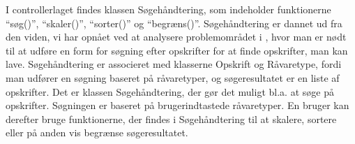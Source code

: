 I controllerlaget findes klassen Søgehåndtering, som indeholder funktionerne ``søg()'', ``skaler()'', ``sorter()'' og ``begræns()''. Søgehåndtering er dannet ud fra den viden, vi har opnået ved at analysere problemområdet i , hvor man er nødt til at udføre en form for søgning efter opskrifter for at finde opskrifter, man kan lave. Søgehåndtering er associeret med klasserne Opskrift og Råvaretype, fordi man udfører en søgning baseret på råvaretyper, og søgeresultatet er en liste af opskrifter. Det er klassen Søgehåndtering, der gør det muligt bl.a. at søge på opskrifter. Søgningen er baseret på brugerindtastede råvaretyper. En bruger kan derefter bruge funktionerne, der findes i Søgehåndtering til at skalere, sortere eller på anden vis begrænse søgeresultatet.
